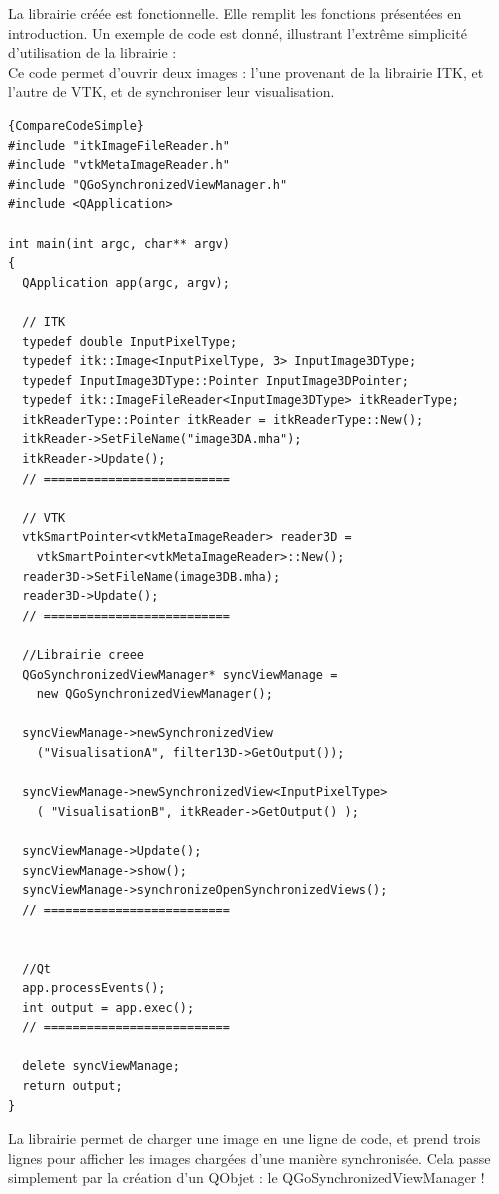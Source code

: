 La librairie créée est fonctionnelle. Elle remplit les fonctions présentées en introduction. Un exemple de code est donné, illustrant l'extrême simplicité d'utilisation de la librairie :\\
Ce code permet d'ouvrir deux images : l'une provenant de la librairie ITK, et l'autre de VTK, et de synchroniser leur visualisation.
\large
  \begin{lstlisting}[title={Utilisation simple de la librairie de comparaison d'images}]{CompareCodeSimple}
#include "itkImageFileReader.h"
#include "vtkMetaImageReader.h"
#include "QGoSynchronizedViewManager.h"
#include <QApplication>

int main(int argc, char** argv)
{
  QApplication app(argc, argv);

  // ITK
  typedef double InputPixelType;
  typedef itk::Image<InputPixelType, 3> InputImage3DType;
  typedef InputImage3DType::Pointer InputImage3DPointer;
  typedef itk::ImageFileReader<InputImage3DType> itkReaderType;
  itkReaderType::Pointer itkReader = itkReaderType::New();
  itkReader->SetFileName("image3DA.mha");
  itkReader->Update();
  // ==========================

  // VTK
  vtkSmartPointer<vtkMetaImageReader> reader3D = 
    vtkSmartPointer<vtkMetaImageReader>::New();
  reader3D->SetFileName(image3DB.mha);
  reader3D->Update();
  // ==========================

  //Librairie creee
  QGoSynchronizedViewManager* syncViewManage =
    new QGoSynchronizedViewManager();

  syncViewManage->newSynchronizedView
    ("VisualisationA", filter13D->GetOutput());

  syncViewManage->newSynchronizedView<InputPixelType>
    ( "VisualisationB", itkReader->GetOutput() );
    
  syncViewManage->Update();
  syncViewManage->show();
  syncViewManage->synchronizeOpenSynchronizedViews();
  // ==========================


  //Qt
  app.processEvents();
  int output = app.exec();
  // ==========================
  
  delete syncViewManage;
  return output;
}
  \end{lstlisting}
\normalsize

La librairie permet de charger une image en une ligne de code,
et prend trois lignes pour afficher les images chargées d'une manière synchronisée.
Cela passe simplement par la création d'un QObjet : le QGoSynchronizedViewManager !\\

